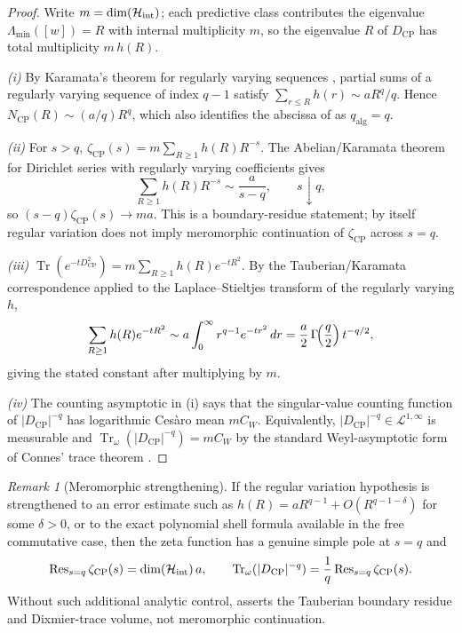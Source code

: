 \documentclass[11pt]{article}
\theoremstyle{definition}
\theoremstyle{remark}
\newtheorem{remark}[theorem]{Remark}
\newcommand{\Hh}{\mathcal{H}}
\newcommand{\CP}{\mathrm{CP}}
\newcommand{\qalg}{q_{\mathrm{alg}}}
\newcommand{\Lam}{\Lambda}
\newcommand{\Tr}{\operatorname{Tr}}
\newcommand{\Res}{\operatorname{Res}}
\begin{document}
\begin{proof}
Write $m=\dim(\Hh_{\rm int})$; each predictive class contributes the eigenvalue
$\Lam_{\min}([w])=R$ with internal multiplicity $m$, so the eigenvalue $R$ of
$D_{\CP}$ has total multiplicity $m\,h(R)$.

\emph{(i)} By Karamata's theorem for regularly varying sequences
\cite{feller}, partial sums of a regularly varying sequence of index $q-1$
satisfy $\sum_{r\le R}h(r)\sim a R^{q}/q$.  Hence $N_{\CP}(R)\sim(a/q)R^{q}$,
which also identifies the abscissa of  as $\qalg=q$.

\emph{(ii)} For $s>q$,
$\zeta_{\CP}(s)=m\sum_{R\ge1}h(R)R^{-s}$.  The Abelian/Karamata theorem for
Dirichlet series with regularly varying coefficients gives
\[
  \sum_{R\ge1}h(R)R^{-s}\sim \frac{a}{s-q},\qquad s\downarrow q,
\]
so $(s-q)\zeta_{\CP}(s)\to m a$.  This is a boundary-residue statement; by
itself regular variation does not imply meromorphic continuation of
$\zeta_{\CP}$ across $s=q$.

\emph{(iii)} $\Tr(e^{-tD_{\CP}^2})=m\sum_{R\ge1}h(R)e^{-tR^2}$.  By the
Tauberian/Karamata correspondence applied to the Laplace--Stieltjes transform of
the regularly varying $h$,
\[
  \sum_{R\ge1}h(R)e^{-tR^2}\sim a\int_0^\infty r^{q-1}e^{-tr^2}\,dr
  =\frac{a}{2}\,\Gamma\!\Bigl(\frac q2\Bigr)\,t^{-q/2},
\]
giving the stated constant after multiplying by $m$.

\emph{(iv)} The counting asymptotic in (i) says that the singular-value counting
function of $|D_{\CP}|^{-q}$ has logarithmic Ces\`aro mean $mC_W$.  Equivalently,
$|D_{\CP}|^{-q}\in\mathcal L^{1,\infty}$ is measurable and
$\Tr_\omega(|D_{\CP}|^{-q})=mC_W$ by the standard Weyl-asymptotic form of
Connes' trace theorem \cite{connes}.
\end{proof}

\begin{remark}[Meromorphic strengthening]
\label{rem:weyl-meromorphic}
If the regular variation hypothesis is strengthened to an error estimate such as
$h(R)=aR^{q-1}+O(R^{q-1-\delta})$ for some $\delta>0$, or to the exact polynomial
shell formula available in the free commutative case, then the zeta function has
a genuine simple pole at $s=q$ and
\[
  \Res_{s=q}\zeta_{\CP}(s)=\dim(\Hh_{\rm int})\,a,
  \qquad
  \Tr_\omega(|D_{\CP}|^{-q})=\frac1q\Res_{s=q}\zeta_{\CP}(s).
\]
Without such additional analytic control,  asserts the
Tauberian boundary residue and Dixmier-trace volume, not meromorphic
continuation.
\end{remark}
\end{document}
